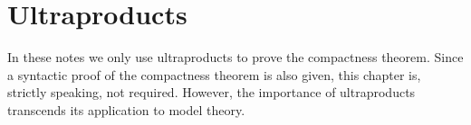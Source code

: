 \chapter{Ultraproducts}
\label{ultraprodotti}

\def\medrel#1{\parbox[t]{6ex}{$\displaystyle\hfil #1$}}
\def\ceq#1#2#3{\parbox[b]{25ex}{$\displaystyle #1$}\medrel{#2}$\displaystyle  #3$}

In these notes we only use ultraproducts to prove the compactness theorem.
Since a syntactic proof of the compactness theorem is also given, this chapter is, strictly speaking, not required.
However, the importance of ultraproducts transcends its application to model theory.











